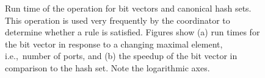 \begin{figure}
	\centering
	\caption[Bit vector speedup over hashset.]{Run time of the  operation for bit vectors and canonical hash sets. This operation is used very frequently by the coordinator to determine whether a rule is satisfied. Figures show (a) run times for the bit vector in response to a changing maximal element, i.e.,\ number of ports, and (b) the speedup of the bit vector in comparison to the hash set. Note the logarithmic axes.}
	\label{fig:bits}
\end{figure}



